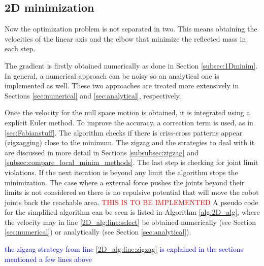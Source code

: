 \subsection{2D minimization}
\label{subsec:2Dminim}

Now the optimization problem is not separated in two. This means obtaining the velocities of the linear axis and the elbow that minimize the reflected mass in each step.

The gradient is firstly obtained numerically as done in Section  \ref{subsec:1Dminim}. In general, a numerical approach can be noisy so an analytical one is implemented as well. These two approaches are treated more extensively in  Sections \ref{sec:numerical} and \ref{sec:analytical}, respectively.

Once the velocity for the null space motion is obtained, it is integrated using a explicit Euler method. To improve the accuracy, a correction term is used, as in \ref{sec:Fabianstuff}. The algorithm checks if there is criss-cross patterns appear (zigzagging) close to the minimum. The zigzag and the strategies to deal with it are discussed in more detail in Sections \ref{subsubsec:zigzag} and  \ref{subsec:compare_local_minim_methods}.
The last step is checking for joint limit violations. If the next iteration is beyond any limit the algorithm stops the minimization. The case where a external force pushes the joints beyond their limits is not considered so there is no repulsive potential that will move the robot joints back the reachable area. \textcolor{red}{THIS IS TO BE IMPLEMENTED}
A pseudo code for the simplified algorithm can be seen is listed in Algorithm \ref{alg:2D_alg}, where the velocity may in line \ref{2D_alg:line:select}  be obtained numerically (see Section \ref{sec:numerical}) or analytically (see Section \ref{sec:analytical}). 

\textcolor{blue}{the zigzag strategy from line \ref{2D_alg:line:zigzag} is explained in the sections mentioned a few lines above}



